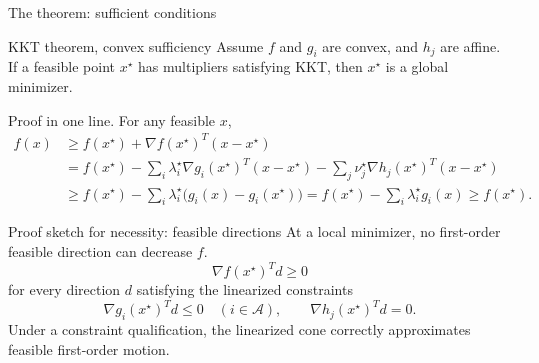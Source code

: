 \documentclass[aspectratio=169]{beamer}
\newcommand{\act}{\mathcal{A}}
\begin{document}
\begin{frame}{The theorem: sufficient conditions}
  \begin{block}{KKT theorem, convex sufficiency}
  Assume $f$ and $g_i$ are convex, and $h_j$ are affine. If a feasible point $x^\star$ has multipliers satisfying KKT, then $x^\star$ is a global minimizer.
  \end{block}
  \vspace{.6em}
  Proof in one line. For any feasible $x$,
  \begin{align*}
    f(x)&\ge f(x^\star)+\nabla f(x^\star)^T(x-x^\star)\\
        &=f(x^\star)-\sum_i\lambda_i^\star \nabla g_i(x^\star)^T(x-x^\star)
          -\sum_j\nu_j^\star \nabla h_j(x^\star)^T(x-x^\star)\\
        &\ge f(x^\star)-\sum_i\lambda_i^\star\bigl(g_i(x)-g_i(x^\star)\bigr)=f(x^\star)-\sum_i\lambda_i^\star g_i(x)\ge f(x^\star).
  \end{align*}
\end{frame}

\begin{frame}{Proof sketch for necessity: feasible directions}
  At a local minimizer, no first-order feasible direction can decrease $f$.
  \vspace{.3em}
  \[
    \nabla f(x^\star)^Td \ge 0
  \]
  for every direction $d$ satisfying the linearized constraints
  \[
    \nabla g_i(x^\star)^Td\le 0\quad (i\in\act),
    \qquad \nabla h_j(x^\star)^Td=0.
  \]
  \vspace{.4em}
  Under a constraint qualification, the linearized cone correctly approximates feasible first-order motion.

  \begin{center}
  \end{center}
\end{frame}
\end{document}
